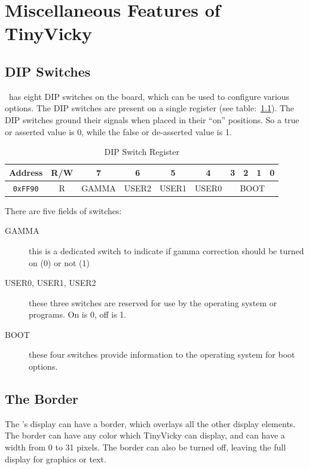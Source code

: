 \chapter{Miscellaneous Features of TinyVicky}

\section*{DIP Switches}

\jr\ has eight DIP switches on the board, which can be used to configure various options. The DIP switches are present on a single register (see table:~\ref{tab:dip_reg}). The DIP switches ground their signals when placed in their ``on'' positions. So a true or asserted value is 0, while the false or de-asserted value is 1.

\begin{table}[ht]
    \begin{center}
        \begin{tabular}{|c|c|c|c|c|c|c|c|c|c|} \hline
            Address & R/W & 7 & 6 & 5 & 4 & 3 & 2 & 1 & 0 \\\hline\hline
            \verb+0xFF90+ & R & GAMMA & USER2 & USER1 & USER0 & \multicolumn{4}{|c|}{BOOT} \\ \hline
        \end{tabular}
    \end{center}
    \caption{DIP Switch Register}
    \label{tab:dip_reg}
\end{table}

There are five fields of switches:
\begin{description}
    \item[GAMMA] this is a dedicated switch to indicate if gamma correction should be turned on (0) or not (1)

    \item[USER0, USER1, USER2] these three switches are reserved for use by the operating system or programs. On is 0, off is 1.

    \item[BOOT] these four switches provide information to the operating system for boot options.
\end{description}

\section*{The Border}

The \jr's display can have a border, which overlays all the other display elements. The border can have any color which TinyVicky can display, and can have a width from 0 to 31 pixels. The border can also be turned off, leaving the full display for graphics or text.

